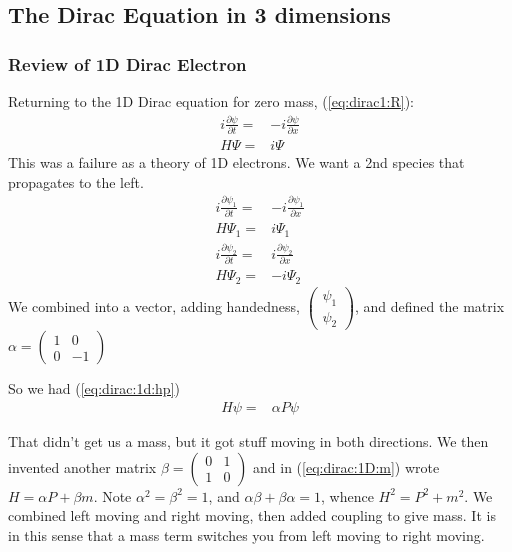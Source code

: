 \documentclass[]{article}
\begin{document}
\subsection{The Dirac Equation in 3 dimensions}

\subsubsection{Review of 1D Dirac Electron}

Returning to the 1D Dirac equation for zero mass, (\ref{eq:dirac1:R}):
\begin{align*}
	i \frac{\partial \psi}{\partial t}=& -i \frac{\partial \psi}{\partial x} \\
	H \Psi =& i \Psi
\end{align*}
This was a failure as a theory of 1D electrons. We want a 2nd species that propagates to the left.
\begin{align*}
	i \frac{\partial \psi_1}{\partial t}=& -i \frac{\partial \psi_1}{\partial x} \\
	H \Psi_1 =& i \Psi_1\\
	i \frac{\partial \psi_2}{\partial t}=& i \frac{\partial \psi_2}{\partial x} \\
	H \Psi_2 =& -i \Psi_2
\end{align*}
We combined into a vector, adding handedness, $\begin{pmatrix} \psi_1\\ \psi_2 \end{pmatrix}$, and defined the matrix $\alpha = \begin{pmatrix}
1&0\\
0&-1
\end{pmatrix}$

So we had (\ref{eq:dirac:1d:hp})
\begin{align*}
	H \psi =& \alpha P \psi
\end{align*}

That didn't get us a mass, but it got stuff moving in both directions. We then invented another matrix $\beta=\begin{pmatrix}
0&1\\
1&0
\end{pmatrix}$ and in (\ref{eq:dirac:1D:m}) wrote $H = \alpha P + \beta m$. Note $\alpha^2=\beta^2=1$, and $\alpha\beta + \beta\alpha=1$, whence $H^2=P^2+m^2$. We combined left moving and right moving, then added coupling to give mass. It is in this sense that a mass term switches you from left moving to right moving.
\end{document}

